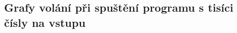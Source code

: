 \documentclass[11pt,a4paper,titlepage]{article}
\begin{document}
	\begin{figure}[ht]
		\centering
	\end{figure}
	\begin{figure}[ht]
		\centering
	\end{figure}

	\newpage

	\subsection{Grafy volání při spuštění programu s tisíci čísly na vstupu}
\end{document}
